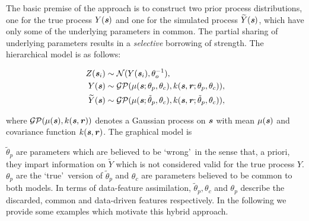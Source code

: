 \documentclass[10pt,a4paper]{article}
\newcommand{\svec} {\textbf{\textit{s}}}
\newcommand{\rvec} {\textbf{\textit{r}}}
\begin{document}
The basic premise of the approach is to construct two prior process distributions, one for the true process $Y(\svec)$ and one for the simulated process $\widetilde{Y}(\svec)$, which have only some of the underlying parameters in common. The partial sharing of underlying parameters results in a \emph{selective} borrowing of strength. The hierarchical model is as follows:

\begin{align}
Z(\svec_i) &\sim \mathcal{N}( Y(\svec_i),\theta_o^{-1}), \\
Y(\svec) &\sim \mathcal{GP}(\mu(\svec;\theta_p, \theta_c), k(\svec,\rvec;\theta_p, \theta_c)), \\
\widetilde{Y}(\svec) &\sim \mathcal{GP}(\mu(\svec;\tilde\theta_p, \theta_c), k(\svec,\rvec;\tilde\theta_p, \theta_c)), 
\end{align}

\noindent where $\mathcal{GP}(\mu(\svec),k(\svec,\rvec))$ denotes a Gaussian process on $\svec$ with mean $\mu(\svec)$ and covariance function $k(\svec,\rvec)$. The graphical model is

\begin{figure}[h!]
\centering
{}
\end{figure}

\noindent $\tilde\theta_p$ are parameters which are believed to be \lq wrong\rq~in the sense that, a priori, they impart information on $\widetilde{Y}$ which is not considered valid for the true process $Y$. $\theta_p$ are the \lq true\rq~version of $\tilde\theta_p$ and $\theta_c$ are parameters believed to be common to both models. In terms of data-feature assimilation,  $\tilde\theta_p, \theta_c$ and $\theta_p$ describe the discarded, common and data-driven features respectively. In the following we provide some examples which motivate this hybrid approach.
\end{document}
